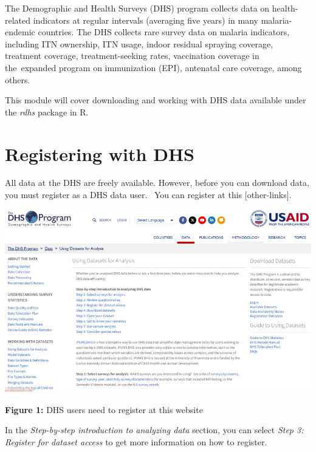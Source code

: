 \documentclass[
  letterpaper,
  DIV=11,
  numbers=noendperiod]{scrreprt}
\begin{document}
\hfill\break

The Demographic and Health Surveys (DHS) program collects data on
health-related indicators at regular intervals (averaging five years) in
many malaria-endemic countries. The DHS collects rare survey data on
malaria indicators, including ITN ownership, ITN usage, indoor residual
spraying coverage, treatment coverage, treatment-seeking rates,
vaccination coverage in the~expanded program on immunization (EPI),
antenatal care coverage, among others.

This module will cover downloading and working with DHS data available
under the \emph{rdhs} package in R.


\chapter{\texorpdfstring{\textbf{Registering with
DHS}}{Registering with DHS}}\label{registering-with-dhs}

All data at the DHS are freely available. However, before you can
download data, you must register as a DHS data user. ~You can register
at this {[}other-links{]}.

\includegraphics[width=5.41667in,height=\textheight,keepaspectratio]{plots/image_02.png}\hfill

\textbf{Figure 1:} DHS users need to register at this website

In the \emph{Step-by-step introduction to analyzing data} section, you
can select \emph{Step 3:~ Register for dataset access} to get more
information on how to register.
\end{document}
